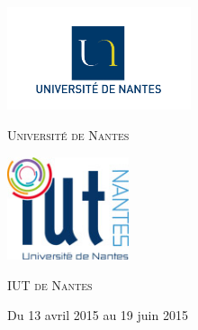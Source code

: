 \begin{titlepage}
\begin{center}
\vfill

\begin{minipage}[t]{0.48\textwidth}

  \begin{flushleft}
    \includegraphics [height=30mm]{img/logo-univ.jpg} \\[0.2cm]
    \begin{spacing}{1.5}
      \textsc{\LARGE Université de Nantes}
    \end{spacing}
  \end{flushleft}

\end{minipage}
\begin{minipage}[t]{0.48\textwidth}

  \begin{flushright}
    \includegraphics [height=30mm]{img/logo-iut.jpg} \\[0.2cm]
    \begin{spacing}{1.5}
      \textsc{\LARGE IUT de Nantes}
    \end{spacing}
  \end{flushright}

\end{minipage}

{\large Du 13 avril 2015 au 19 juin 2015}

\end{center}

\end{titlepage}
